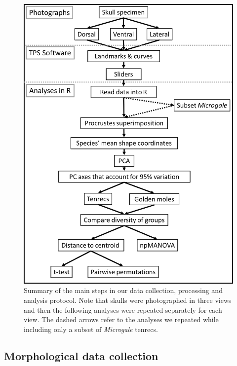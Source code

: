 \documentclass[12pt,a4paper]{article}
\begin{document}
		\begin{figure}
		\centering
		\includegraphics[width=1\linewidth]{figures/Methods_flowchart.png}
		
		\caption[Flowchart diagram of data collection and analysis]
			{Summary of the main steps in our data collection, processing and analysis protocol. Note that skulls were photographed in three views and then the following analyses were repeated separately for each view. The dashed arrows refer to the analyses we repeated while including only a subset of \textit{Microgale} tenrecs.}
		
		\label{fig:flow}
		\end{figure}
	
	

\subsection{Morphological data collection} 
	
\end{document}

